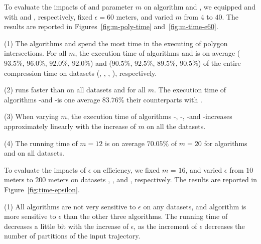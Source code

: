 To evaluate the impacts of \rpia and parameter $m$ on algorithm \cist and \cista, we
equipped \cist and \cista with \rpia and \cpia, respectively, fixed $\epsilon =60$ meters, and varied $m$ from $4$ to $40$.
%
The results are reported in Figures~\ref{fig:m-poly-time} and~\ref{fig:m-time-e60}.

\ni(1) The algorithms \cist and \cista spend the most time in the executing of
polygon intersections. For all $m$, the execution time of algorithms \cpia and
\rpia is on average {($93.5\%$, $96.0\%$, $92.0\%$, $92.0\%$)
and ($90.5\%$, $92.5\%$, $89.5\%$, $90.5\%$)} of the entire compression  time on {datasets}
(\sercar, \geolife, \mopsi,  \pricar), respectively.

\ni(2) \rpia runs faster than \cpia on all datasets and for all $m$. The execution time of algorithms \cist-\rpia and \cista-\rpia is one average $83.76\%$ their counterparts with \cpia.

\ni(3) When varying $m$, the execution time of algorithms \cist-\rpia, \cist-\cpia, \cista-\rpia and \cista-\cpia increases approximately linearly with the increase of $m$ on all the datasets.

\ni(4) The running time of $m=12$ is on average $70.05\%$ of $m=20$ for algorithms \cist and \cista on all datasets.




To evaluate the impacts of $\epsilon$ on efficiency, we fixed $m$ = $16$,
and varied $\epsilon$  from $10$ meters to $200$ meters on
{datasets}  \sercar, \geolife, \mopsi and \pricar, respectively.
The results are reported in Figure~\ref{fig:time-epsilon}.

\ni(1) All algorithms are not very sensitive to $\epsilon$ on any datasets, and algorithm \dps is more sensitive to $\epsilon$ than the other three algorithms.
The running time of \dps decreases a little bit with the increase of $\epsilon$, as the increment of $\epsilon$ decreases the number of partitions of the input trajectory.


